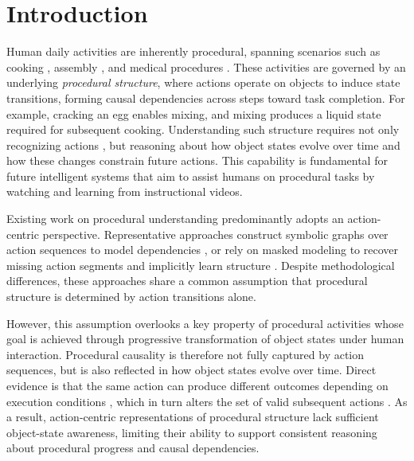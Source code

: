 \section{Introduction}
\label{sec:intro}

Human daily activities are inherently procedural, spanning scenarios such as cooking \cite{damen2020epic,peddi2024captaincook4d}, assembly \cite{sener2022assembly101}, and medical procedures \cite{ozsoy2025egoexor}. These activities are governed by an underlying \emph{procedural structure}, where actions operate on objects to induce state transitions, forming causal dependencies across steps toward task completion. For example, cracking an egg enables mixing, and mixing produces a liquid state required for subsequent cooking. Understanding such structure requires not only recognizing actions \cite{Bao_2021_ICCV}, but reasoning about how object states evolve over time \cite{souvcek2022look} and how these changes constrain future actions. This capability is fundamental for future intelligent systems that aim to assist humans on procedural tasks by watching and learning from instructional videos.

Existing work on procedural understanding predominantly adopts an action-centric perspective. Representative approaches construct symbolic graphs over action sequences to model dependencies \cite{jang2023multimodal, ashutosh2023video, soran2015generating, sohn2020meta, Huang_2025_CVPR, lee2025error}, or rely on masked modeling to recover missing action segments and implicitly learn structure \cite{narasimhan2023learning, lin2024vedit, zhong2023learning}. Despite methodological differences, these approaches share a common assumption that procedural structure is determined by action transitions alone.

However, this assumption overlooks a key property of procedural activities whose goal is achieved through progressive transformation of object states under human interaction. Procedural causality is therefore not fully captured by action sequences, but is also reflected in how object states evolve over time. Direct evidence is that the same action can produce different outcomes depending on execution conditions \cite{guo2026procedural}, which in turn alters the set of valid subsequent actions \cite{niu2024schema}. As a result, action-centric representations of procedural structure lack sufficient object-state awareness, limiting their ability to support consistent reasoning about procedural progress and causal dependencies.

